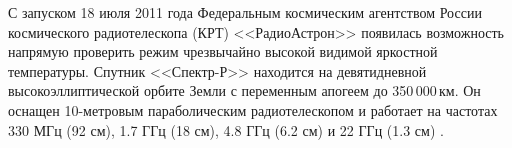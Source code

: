 С запуском 18 июля 2011 года Федеральным космическим агентством России космического радиотелескопа
(КРТ) <<РадиоАстрон>> появилась возможность напрямую проверить режим чрезвычайно
высокой видимой яркостной температуры. Спутник <<Спектр-Р>> находится на девятидневной
высокоэллиптической орбите Земли с переменным апогеем до 350\,000\,км. Он оснащен 10-метровым
параболическим радиотелескопом и работает на частотах 330 МГц (92 см), 1.7 ГГц (18 см), 4.8 ГГц
(6.2 см) и 22 ГГц (1.3 см) \cite{Kardashev_2013_rus}.

\begin{figure}[]
\end{figure}
